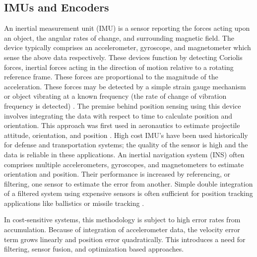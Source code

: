 \documentclass{article}
\begin{document}
  \subsection{IMUs and Encoders}
    An inertial measurement unit (IMU) is a sensor reporting the forces acting upon an object, the angular rates of change, and surrounding magnetic field. The device typically comprises an accelerometer, gyroscope, and magnetometer which sense the above data respectively. These devices function by detecting Coriolis forces, inertial forces acting in the direction of motion relative to a rotating reference frame. These forces are proportional to the magnitude of the acceleration. These forces may be detected by a simple strain gauge mechanism or object vibrating at a known frequency (the rate of change of vibration frequency is detected) \cite{barshan_inertial_2017}. The premise behind position sensing using this device involves integrating the data with respect to time to calculate position and orientation. This approach was first used in aeronautics to estimate projectile attitude, orientation, and position \cite{nasa_kalman_1999}. High cost IMU's have been used historically for defense and transportation systems; the quality of the sensor is high and the data is reliable in these applications. An inertial navigation system (INS) often comprises multiple accelerometers, gyroscopes, and magnetometers to estimate orientation and position. Their performance is increased by referencing, or filtering, one sensor to estimate the error from another. Simple double integration of a filtered system using expensive sensors is often sufficient for position tracking applications like ballistics or missile tracking \cite{barshan_inertial_2017}.

    In cost-sensitive systems, this methodology is subject to high error rates from accumulation. Because of integration of accelerometer data, the velocity error term grows linearly and position error quadratically. This introduces a need for filtering, sensor fusion, and optimization based approaches.
\end{document}
